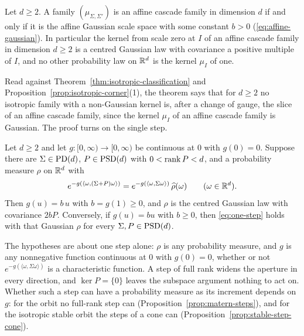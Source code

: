 \begin{theorem}\label{thm:affine-rigidity}
Let $d \ge 2$. A family $(\mu_{\Sigma,\Sigma'})$ is an affine cascade family in dimension $d$ if
and only if it is the affine Gaussian scale space with some constant $b > 0$
(\ref{eq:affine-gaussian}). In particular the kernel from scale zero at $I$ of an affine cascade
family in dimension $d \ge 2$ is a centred Gaussian law with covariance a positive multiple of $I$,
and no other probability law on $\mathbb{R}^d$ is the kernel $\mu_I$ of one.
\end{theorem}

Read against Theorem~\ref{thm:isotropic-classification} and Proposition~\ref{prop:isotropic-corner}(1),
the theorem says that for $d \ge 2$ no isotropic family with a non-Gaussian kernel is, after a change
of gauge, the slice of an affine cascade family, since the kernel $\mu_I$ of an affine cascade family
is Gaussian. The proof turns on the single step.

\begin{theorem}\label{thm:rank-deficient-step}
Let $d \ge 2$ and let $g : [0,\infty) \to [0,\infty)$ be continuous at $0$ with $g(0) = 0$.
Suppose there are $\Sigma \in \mathrm{PD}(d)$, $P \in \mathrm{PSD}(d)$ with $0 < \operatorname{rank} P < d$, and a probability
measure $\rho$ on $\mathbb{R}^d$ with
\begin{equation}\label{eq:one-step}
  e^{-g(\langle\omega,(\Sigma+P)\omega\rangle)}
   = e^{-g(\langle\omega,\Sigma\omega\rangle)}\,\widehat\rho(\omega)
   \qquad (\omega \in \mathbb{R}^d).
\end{equation}
Then $g(u) = b\,u$ with $b = g(1) \ge 0$, and $\rho$ is the centred Gaussian law with covariance
$2bP$. Conversely, if $g(u) = bu$ with $b \ge 0$, then \ref{eq:one-step} holds with that Gaussian
$\rho$ for every $\Sigma, P \in \mathrm{PSD}(d)$.
\end{theorem}

The hypotheses are about one step alone: $\rho$ is any probability measure, and $g$ is any
nonnegative function continuous at $0$ with $g(0) = 0$, whether or not
$e^{-g(\langle\omega,\Sigma\omega\rangle)}$ is a characteristic function. A step of full rank widens
the aperture in every direction, and $\ker P = \{0\}$ leaves the subspace argument nothing to act
on. Whether such a step can have a probability measure as its increment depends on $g$: for the
\Matern{} orbit no full-rank step can (Proposition~\ref{prop:matern-steps}), and for the isotropic
stable orbit the steps of a cone can (Proposition~\ref{prop:stable-step-cone}).

